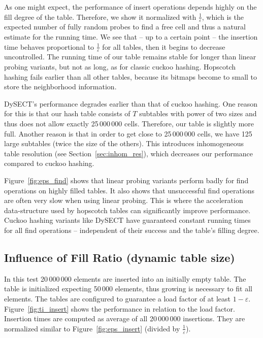 \documentclass[a4paper,UKenglish]{lipics-v2016}
\begin{document}
As one might expect, the performance of insert operations depends
highly on the fill degree of the table.  Therefore, we show it
normalized with $\frac{1}{\varepsilon}$, which is the expected number
of fully random probes to find a free cell and thus a natural estimate
for the running time. We see that -- up to a certain point -- the
insertion time behaves proportional to $\frac{1}{\varepsilon}$ for all
tables, then it begins to decrease uncontrolled.  The running time of
our table remains stable for longer than linear probing variants, but
not as long, as for classic cuckoo hashing.  Hopscotch hashing fails
earlier than all other tables, because its bitmaps become to small to
store the neighborhood information.

DySECT's performance degrades earlier than that of cuckoo hashing.  One reason
for this is that our hash table consists of $T$ subtables with power
of two sizes and thus does not allow exactly 25\,000\,000 cells.  Therefore,
our table is slightly more full.  Another reason is that in order to get close
to 25\,000\,000 cells, we have 125 large subtables (twice the size of
the others).  This introduces inhomogeneous table resolution (see
Section~\ref{sec:inhom_res}), which decreases our performance compared to
cuckoo hashing.

Figure~\ref{fig:eps_find} shows that linear probing variants perform
badly for find operations on highly filled tables.  It also shows that
unsuccessful find operations are often very slow when using linear
probing.  This is where the acceleration data-structure used by
hopscotch tables can significantly improve performance.  Cuckoo hashing variants like DySECT have
guaranteed constant running times for all find operations --
independent of their success and the table's filling degree.

\subsection{Influence of Fill Ratio (dynamic table size)}
\label{sec:exp_ti}
In this test 20\,000\,000 elements are inserted into an initially empty
table.  The table is initialized expecting 50\,000 elements, thus
growing is necessary to fit all elements.  The tables are configured
to guarantee a load factor of at least
$1-\varepsilon$. Figure~\ref{fig:ti_insert} shows the performance in
relation to the load factor.  Insertion times are computed as average of all 20\,000\,000 insertions. They are normalized similar to
Figure~\ref{fig:eps_insert} (divided by $\frac{1}{\varepsilon}$).
\end{document}
